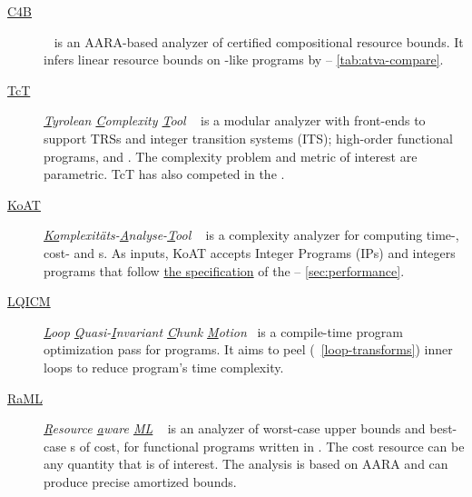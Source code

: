 \begin{description}
\item[\href{https://github.com/academic-archive/pldi15}{C4B}]
      ~\cite{carbonneaux2015}
      is an AARA-based analyzer of certified compositional resource bounds. It
      infers linear resource bounds on -like programs by  --
      \autoref{tab:atva-compare}.

\item[\href{http://cl-informatik.uibk.ac.at/software/tct/}{TcT}]
       \emph{\underline{T}yrolean \underline{C}omplexity \underline{T}ool}
       ~\cite{avanzini2016}
       is a modular analyzer with front-ends to support TRSs and integer
       transition systems (ITS); high-order functional programs, and . The complexity problem and metric of interest are parametric.
       TcT has also competed in the .

\item[\href{https://koat.verify.rwth-aachen.de/cfr_mprf}{KoAT}]
       \emph{\underline{Ko}mplexitäts-\underline{A}nalyse-\underline{T}ool}
       ~\cite{brockschmidt2016}
       is a complexity analyzer for computing time-, cost- and s. As inputs, KoAT accepts Integer Programs (IPs) and  integers programs that follow
       \href{https://termination-portal.org/wiki/C_Integer_Programs}{the
        specification} of the  --
       \autoref{sec:performance}.

\item[\href{https://github.com/statycc/LQICM_On_C_Toy_Parser}{LQICM}]
      \emph{\underline{L}oop \underline{Q}uasi-\underline{I}nvariant
      \underline{C}hunk \underline{M}otion}~\cite{moyen20172} is a
      compile-time program optimization pass for  programs. It aims to
      peel (\cf~\autoref{loop-transforms}) inner loops to reduce program's time
      complexity.

\item[\href{https://www.raml.co/about}{RaML}]
       \emph{\underline{R}esource \underline{a}ware \underline{ML}}
       ~\cite{hoffmann2017}
       is an analyzer of worst-case upper bounds and best-case s of cost, for functional programs written in . The cost
       resource can be any quantity that is of interest. The  analysis
       is based on AARA and can produce precise amortized
       bounds.


\end{description}
